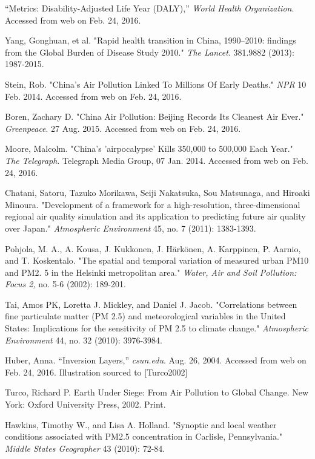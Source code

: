 \documentclass[11pt]{article} %
\begin{document}
\begin{thebibliography}{1}
 ``Metrics: Disability-Adjusted Life Year (DALY),'' \textit{World Health Organization}. Accessed from web on Feb. 24, 2016.

Yang, Gonghuan, et al. "Rapid health transition in China, 1990–2010: findings from the Global Burden of Disease Study 2010." \textit{The Lancet}. 381.9882 (2013): 1987-2015.

Stein, Rob. "China's Air Pollution Linked To Millions Of Early Deaths." \textit{NPR} 10 Feb. 2014. Accessed from web on Feb. 24, 2016.

Boren, Zachary D. "China Air Pollution: Beijing Records Its Cleanest Air Ever." \textit{Greenpeace}. 27 Aug. 2015. Accessed from web on Feb. 24, 2016.

Moore, Malcolm. "China's 'airpocalypse' Kills 350,000 to 500,000 Each Year." \textit{The Telegraph}. Telegraph Media Group, 07 Jan. 2014. Accessed from web on Feb. 24, 2016.

Chatani, Satoru, Tazuko Morikawa, Seiji Nakatsuka, Sou Matsunaga, and Hiroaki Minoura. "Development of a framework for a high-resolution, three-dimensional regional air quality simulation and its application to predicting future air quality over Japan." \textit{Atmospheric Environment} 45, no. 7 (2011): 1383-1393.

Pohjola, M. A., A. Kousa, J. Kukkonen, J. Härkönen, A. Karppinen, P. Aarnio, and T. Koskentalo. "The spatial and temporal variation of measured urban PM10 and PM2. 5 in the Helsinki metropolitan area." \textit{Water, Air and Soil Pollution: Focus 2,} no. 5-6 (2002): 189-201.

Tai, Amos PK, Loretta J. Mickley, and Daniel J. Jacob. "Correlations between fine particulate matter (PM 2.5) and meteorological variables in the United States: Implications for the sensitivity of PM 2.5 to climate change." \textit{Atmospheric Environment} 44, no. 32 (2010): 3976-3984.

 Huber, Anna. ``Inversion Layers,'' \textit{csun.edu}. Aug. 26, 2004. Accessed from web on Feb. 24, 2016. 
Illustration sourced to [Turco2002]

Turco, Richard P. Earth Under Siege: From Air Pollution to Global Change. New York: Oxford University Press, 2002. Print.

Hawkins, Timothy W., and Lisa A. Holland. "Synoptic and local weather conditions associated with PM2.5 concentration in Carlisle, Pennsylvania." \textit{Middle States Geographer} 43 (2010): 72-84.



\end{thebibliography}
\end{document}

